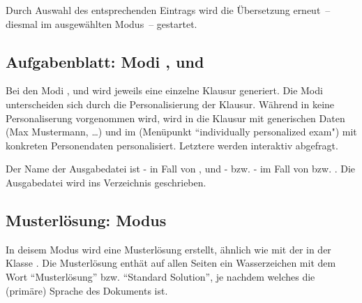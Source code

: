 \documentclass[
load=osgexam,
babel=ngerman
]{skdoc}
\begin{document}
Durch Auswahl des entsprechenden Eintrags wird die Übersetzung erneut~-- diesmal im ausgewählten Modus~-- gestartet.

\subsection{Aufgabenblatt: Modi ,  und }
Bei den Modi  ,  und  wird jeweils eine einzelne Klausur generiert.
Die Modi unterscheiden sich durch die Personalisierung der Klausur. Während in  keine Personaliserung
vorgenommen wird, wird in  die Klausur mit generischen Daten (Max Mustermann, \ldots) und im 
(Menüpunkt ``individually personalized exam") mit konkreten Personendaten personalisiert. Letztere werden interaktiv
abgefragt.

Der Name der Ausgabedatei ist - in Fall von , und
- bzw. - im Fall von  bzw. . Die
Ausgabedatei wird ins Verzeichnis  geschrieben.

\subsection{Musterlösung: Modus }
In deisem Modus wird eine Musterlösung erstellt, ähnlich wie mit der  in der Klasse .
Die Musterlösung enthät auf allen Seiten ein Wasserzeichen mit dem Wort ``Musterlösung'' bzw. ``Standard Solution'', je
nachdem welches die (primäre) Sprache des Dokuments ist.
\end{document}
